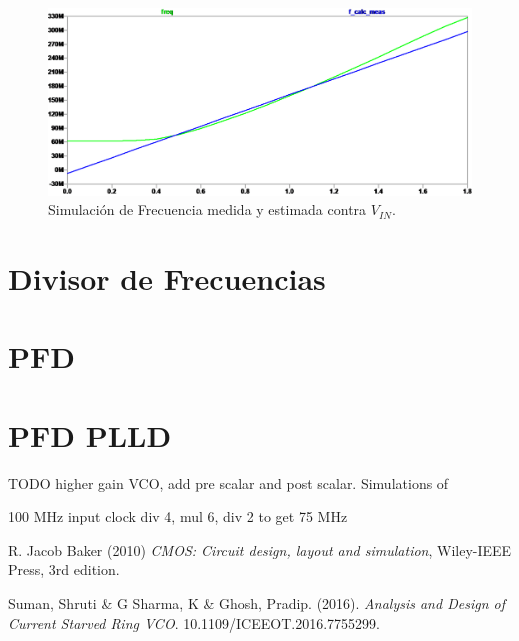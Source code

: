 \documentclass[a4paper]{article}
\begin{document}
\begin{figure}[!htb]
\centering
\includegraphics[scale=0.4]{./img/vco7_sim}
\caption{Simulación de Frecuencia medida y estimada contra $V_{IN}$.}
\label{fig:vco7_sim}
\end{figure}

\section{Divisor de Frecuencias}

\section{PFD}

\section{PFD PLLD}




TODO higher gain VCO, add pre scalar and post scalar. Simulations of

100 MHz input clock div 4, mul 6, div 2 to get 75 MHz


\begin{thebibliography}{9}

R. Jacob Baker (2010) \emph{CMOS: Circuit design, layout and simulation}, Wiley-IEEE Press, 3rd edition.

Suman, Shruti \& G Sharma, K \& Ghosh, Pradip. (2016). \emph{Analysis and Design of Current Starved Ring VCO}. 10.1109/ICEEOT.2016.7755299.

\end{thebibliography}
\end{document}

